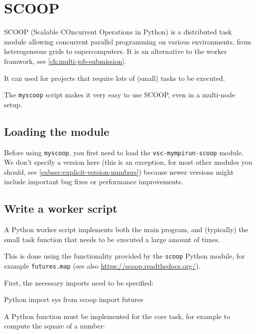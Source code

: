 \chapter{SCOOP}
\label{ch:scoop}

SCOOP (Scalable COncurrent Operations in Python) is a distributed task module allowing
concurrent parallel programming on various environments, from heterogeneous grids to supercomputers.
It is an alternative to the worker framwork, see \autoref{ch:multi-job-submission}.


It can used for projects that require lots of (small) tasks to be executed.

The \lstinline|myscoop| script makes it very easy to use SCOOP, even in a multi-node setup.

\section{Loading the module}

Before using \lstinline|myscoop|, you first need to load the \lstinline|vsc-mympirun-scoop| module. We don't specify
a version here (this is an exception, for most other modules you should, see \autoref{subsec:explicit-version-numbers})
because newer versions might include important bug fixes or performance improvements.

\begin{prompt}
\end{prompt}

\section{Write a worker script}

A Python worker script implements both the main program, and (typically) the small task
function that needs to be executed a large amount of times.

This is done using the functionality provided by the \lstinline|scoop| Python module,
for example \lstinline|futures.map| (see also \url{https://scoop.readthedocs.org/}).

First, the necessary imports need to be specified:

\begin{code}{Python}
import sys
from scoop import futures
\end{code}

A Python function must be implemented for the core task, for example to compute the square of a number:

